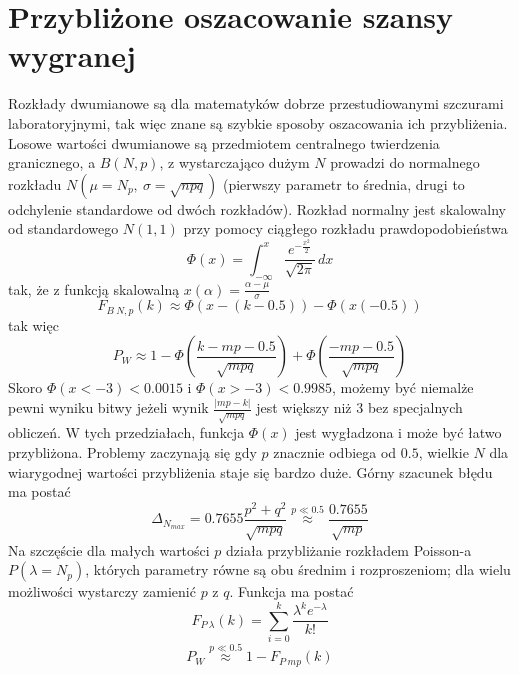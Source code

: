 \documentclass{article}
\begin{document}
\section{Przybliżone oszacowanie szansy wygranej}
Rozkłady dwumianowe są dla matematyków dobrze przestudiowanymi szczurami laboratoryjnymi, tak więc znane są szybkie sposoby oszacowania ich przybliżenia. Losowe wartości dwumianowe są przedmiotem centralnego twierdzenia granicznego, a $B(N,p)$, z wystarczająco dużym $N$ prowadzi do normalnego rozkładu $N(\mu = N_p, \: \sigma = \sqrt{npq})$ (pierwszy parametr to średnia, drugi to odchylenie standardowe od dwóch rozkładów). Rozkład normalny jest skalowalny od standardowego $N(1,1)$ przy pomocy ciągłego rozkładu prawdopodobieństwa
\begin{equation*}
    \Phi (x) = \int^{x}_{- \infty}
    \frac{e ^{-\frac{x^2}{2}}}
    {\sqrt{2\pi}}\,dx
\end{equation*}
tak, że z funkcją skalowalną $x(\alpha) = \frac{\alpha-\mu}{\sigma}$
\begin{equation*}
    F_{B \: N,p}(k) \approx \Phi(x-(k-0.5))-\Phi(x(-0.5))
\end{equation*}
tak więc
\begin{equation*}
    P_W \approx 1 - \Phi \left(
    \frac{k - mp - 0.5}{\sqrt{mpq}}\right)
    +
    \Phi\left(\frac{-mp-0.5}{\sqrt{mpq}}\right)
\end{equation*}
Skoro $\Phi(x < -3) < 0.0015$ i $\Phi(x > -3) < 0.9985$, możemy być niemalże pewni wyniku bitwy jeżeli wynik $\frac{|mp-k|}{\sqrt{mpq}}$ jest większy niż 3 bez specjalnych obliczeń. W tych przedziałach, funkcja $\Phi(x)$ jest wygładzona i może być łatwo przybliżona. \newline
Problemy zaczynają się gdy $p$ znacznie odbiega od $0.5$, wielkie $N$ dla wiarygodnej wartości przybliżenia staje się bardzo duże.
Górny szacunek błędu ma postać
\begin{equation*}
    \Delta_{N_{max}} = 0.7655 \frac{p^2+q^2}{\sqrt{mpq}} \overset{p \ll 0.5}{\approx} \frac{0.7655}{\sqrt{mp}}
\end{equation*}
Na szczęście dla małych wartości $p$ działa przybliżanie rozkładem Poisson-a $P(\lambda = N_p)$, których parametry równe są obu średnim i rozproszeniom; dla wielu możliwości wystarczy zamienić $p$ z $q$. Funkcja ma postać
\begin{equation}
    F_{P\: \lambda} (k) = \sum^{k}_{i=0} \frac{\lambda^{k}e^{-\lambda}}{k!}
\end{equation}
\begin{equation*}
    P_{W} \overset{p \ll 0.5}{\approx} 1 - F_{P \: mp} (k)
\end{equation*}
\end{document}
